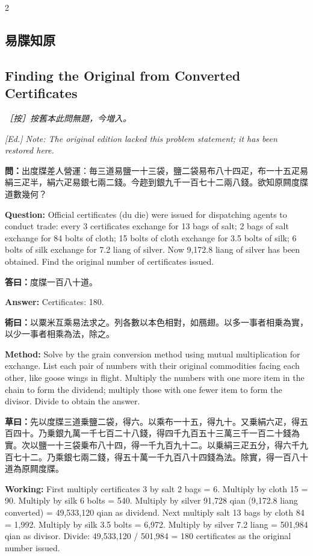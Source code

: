 \documentclass[11pt,a4paper]{article}
\newcommand{\QuestionText}[1]{\par\noindent\textbf{\color{problemcolor}問：}#1\par}
\newcommand{\AnswerText}[1]{\par\noindent\textbf{\color{answercolor}答曰：}#1\par}
\newcommand{\MethodText}[1]{\par\noindent\textbf{\color{methodcolor}術曰：}#1\par}
\newcommand{\WorkingText}[1]{\par\noindent\textbf{草曰：}#1\par}
\newcommand{\EdNoteText}[1]{\par\noindent\textit{\color{ednotecolor}［按］#1}\par}
\newcommand{\QuestionEn}[1]{\par\noindent\textbf{\color{problemcolor}Question:} #1\par}
\newcommand{\AnswerEn}[1]{\par\noindent\textbf{\color{answercolor}Answer:} #1\par}
\newcommand{\MethodEn}[1]{\par\noindent\textbf{\color{methodcolor}Method:} #1\par}
\newcommand{\WorkingEn}[1]{\par\noindent\textbf{Working:} #1\par}
\newcommand{\EdNoteEn}[1]{\par\noindent\textit{\color{ednotecolor}[Ed.] #1}\par}
\begin{document}
\begin{paracol}{2}

\subsection*{\color{sectioncolor}易牒知原}
\switchcolumn
\subsection*{\color{sectioncolor}Finding the Original from Converted Certificates}
\switchcolumn*

\EdNoteText{按舊本此問無題，今増入。}
\switchcolumn
\EdNoteEn{Note: The original edition lacked this problem statement; it has been restored here.}
\switchcolumn*

\QuestionText{出度牒差人營運：毎三道易鹽一十三袋，鹽二袋易布八十四疋，布一十五疋易絹三疋半，絹六疋易銀七兩二錢。今趂到銀九千一百七十二兩八錢。欲知原闗度牒道數幾何？}
\switchcolumn
\QuestionEn{Official certificates (du die) were issued for dispatching agents to conduct trade: every 3 certificates exchange for 13 bags of salt; 2 bags of salt exchange for 84 bolts of cloth; 15 bolts of cloth exchange for 3.5 bolts of silk; 6 bolts of silk exchange for 7.2 liang of silver. Now 9,172.8 liang of silver has been obtained. Find the original number of certificates issued.}
\switchcolumn*

\AnswerText{度牒一百八十道。}
\switchcolumn
\AnswerEn{Certificates: 180.}
\switchcolumn*

\MethodText{以粟米互乘易法求之。列各數以本色相對，如鴈翅。以多一事者相乗為實，以少一事者相乘為法，除之。}
\switchcolumn
\MethodEn{Solve by the grain conversion method using mutual multiplication for exchange. List each pair of numbers with their original commodities facing each other, like goose wings in flight. Multiply the numbers with one more item in the chain to form the dividend; multiply those with one fewer item to form the divisor. Divide to obtain the answer.}
\switchcolumn*

\WorkingText{先以度牒三道乗鹽二袋，得六。以乘布一十五，得九十。又乗絹六疋，得五百四十。乃乗銀九萬一千七百二十八錢，得四千九百五十三萬三千一百二十錢為實。次以鹽一十三袋乗布八十四，得一千九百九十二。以乗絹三疋五分，得六千九百七十二。乃乘銀七兩二錢，得五十萬一千九百八十四錢為法。除實，得一百八十道為原闗度牒。}
\switchcolumn
\WorkingEn{First multiply certificates 3 by salt 2 bags = 6. Multiply by cloth 15 = 90. Multiply by silk 6 bolts = 540. Multiply by silver 91,728 qian (9,172.8 liang converted) = 49,533,120 qian as dividend. Next multiply salt 13 bags by cloth 84 = 1,992. Multiply by silk 3.5 bolts = 6,972. Multiply by silver 7.2 liang = 501,984 qian as divisor. Divide: 49,533,120 / 501,984 = 180 certificates as the original number issued.}
\switchcolumn*


\end{paracol}
\end{document}
